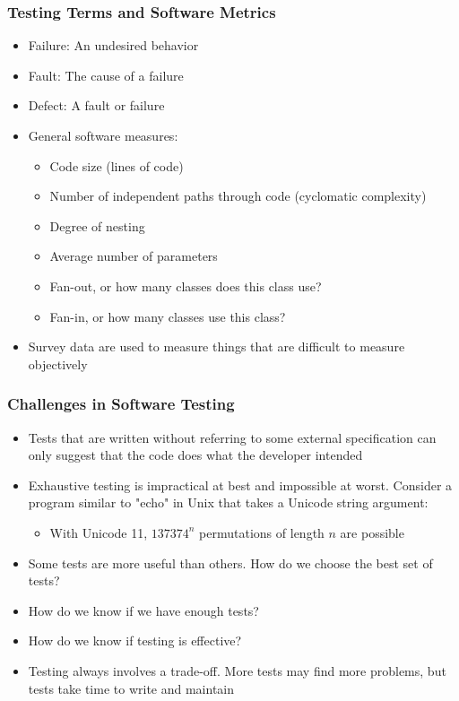 \documentclass{beamer}
\begin{document}
\begin{frame}
\frametitle{Testing Terms and Software Metrics}
\begin{itemize}
	\item Failure: An undesired behavior
	\item Fault: The cause of a failure
	\item Defect: A fault or failure
	\item General software measures:
	\begin{itemize}
		\item Code size (lines of code)
		\item Number of independent paths through code (cyclomatic complexity)
		\item Degree of nesting
		\item Average number of parameters
		\item Fan-out, or how many classes does this class use?
		\item Fan-in, or how many classes use this class?
	\end{itemize}
	\item Survey data are used to measure things that are difficult to measure objectively
\end{itemize}
\end{frame}

\begin{frame}
\frametitle{Challenges in Software Testing}
\begin{itemize}
	\item Tests that are written without referring to some external specification can only suggest that the code does what the developer intended
	\item Exhaustive testing is impractical at best and impossible at worst. Consider a program similar to "echo" in Unix that takes a Unicode string argument:
	\begin{itemize}
		\item With Unicode 11, $137374^n$ permutations of length $n$ are possible\cite{unicodestd}
	\end{itemize}
	\item Some tests are more useful than others. How do we choose the best set of tests?
	\item How do we know if we have enough tests?
	\item How do we know if testing is effective?
	\item Testing always involves a trade-off. More tests may find more problems, but tests take time to write and maintain
\end{itemize}
\end{frame}
\end{document}
